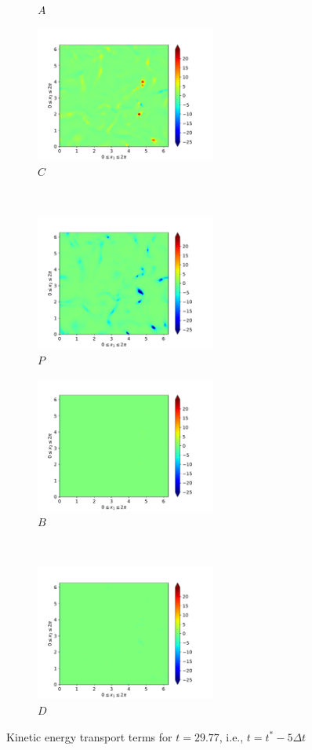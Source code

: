 \begin{figure}[H]
\begin{subfigure}{0.45\textwidth}
        \caption{$A$}
    \end{subfigure}
    \newline
    \begin{subfigure}{0.45\textwidth}
        \includegraphics[height=1.75in]{media/run-cds-65/C-ke-1335}
        \caption{$C$}
    \end{subfigure}
    ~
    \begin{subfigure}{0.45\textwidth}
        \includegraphics[height=1.75in]{media/run-cds-65/P-ke-1335}
        \caption{$P$}
    \end{subfigure}
    \newline
    \begin{subfigure}{0.45\textwidth}
        \includegraphics[height=1.75in]{media/run-cds-65/B-ke-1335}
        \caption{$B$}
    \end{subfigure}
    ~
    \begin{subfigure}{0.45\textwidth}
        \includegraphics[height=1.75in]{media/run-cds-65/D-ke-1335}
        \caption{$D$}
    \end{subfigure}
    \caption{Kinetic energy transport terms for $t=29.77$, i.e., $t=t^{\ast} -5 \Delta t$}
\end{figure}

